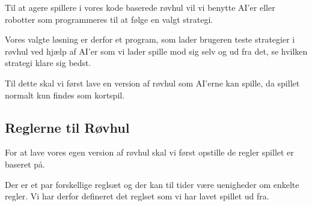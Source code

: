 \documentclass[a4paper, 12pt]{article}
\begin{document}
\begin{multicols}{2}
Til at agere spillere i vores kode baserede røvhul vil vi benytte AI'er eller robotter som programmeres til at følge en valgt strategi.

Vores valgte løsning er derfor et program, som lader brugeren teste strategier i røvhul ved hjælp af AI'er som vi lader spille mod sig selv og ud fra det, se hvilken strategi klare sig bedst.

Til dette skal vi først lave en version af røvhul som AI'erne kan spille, da spillet normalt kun findes som kortspil. 

\subsection{Reglerne til Røvhul}
For at lave vores egen version af røvhul skal vi først opstille de regler spillet er baseret på.

Der er et par forskellige reglsæt og der kan til tider være uenigheder om enkelte regler. Vi har derfor defineret det reglset som vi har lavet spillet ud fra.


\end{multicols}
\end{document}
